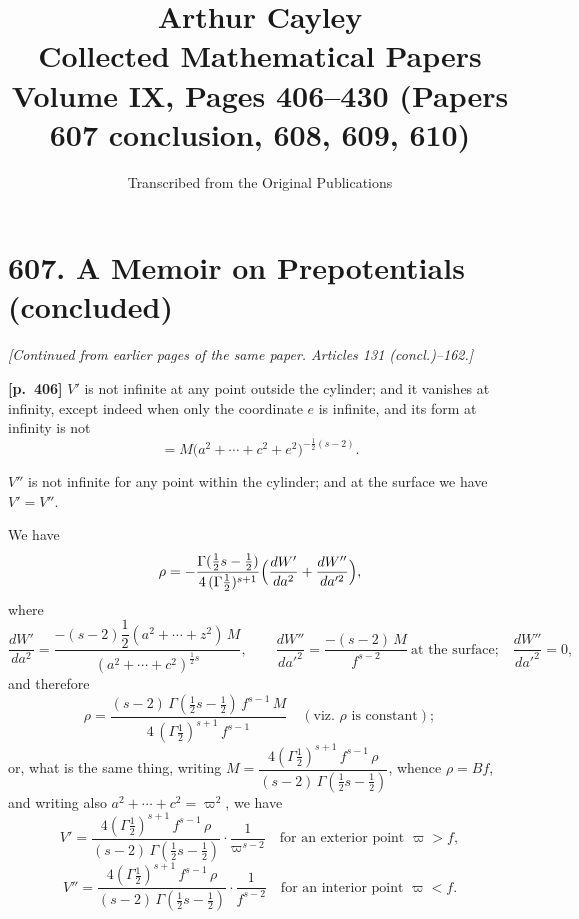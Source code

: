 \documentclass[11pt,a4paper]{article}
\title{\textbf{Arthur Cayley}\\\vspace{0.5em}
\Large Collected Mathematical Papers\\\vspace{0.3em}
\large Volume IX, Pages 406--430 (Papers 607 conclusion, 608, 609, 610)}
\author{Transcribed from the Original Publications}
\date{}
\begin{document}
\maketitle
\thispagestyle{empty}

\tableofcontents
\newpage

\section*{\textbf{607.} A Memoir on Prepotentials (concluded)}

\textit{[Continued from earlier pages of the same paper. Articles 131 (concl.)--162.]}

\bigskip

\noindent\textbf{[p.~406]}\quad
$V'$ is not infinite at any point outside the cylinder; and it vanishes at infinity, except indeed when only the coordinate $e$ is infinite, and its form at infinity is not
\[
= M\bigl(a^{2}+\cdots+c^{2}+e^{2}\bigr)^{-\tfrac{1}{2}(s-2)}.
\]

$V''$ is not infinite for any point within the cylinder; and at the surface we have $V' = V''$.

We have
\[
\rho = -\frac{\Gamma(\tfrac{1}{2}s-\tfrac{1}{2})}{4\,(\Gamma\tfrac{1}{2})^{s+1}}\Bigl(\frac{dW'}{da^{2}} + \frac{dW''}{da'^{2}}\Bigr),
\]
where
\[
\frac{dW'}{da^{2}} = \frac{-(s-2)\dfrac{1}{2}(a^{2}+\cdots+z^{2})\,M}{(a^{2}+\cdots+c^{2})^{\tfrac{1}{2}s}},\qquad \frac{dW''}{da'^{2}} = \frac{-(s-2)\,M}{f^{s-2}}\ \text{at the surface;}\quad \frac{dW''}{da'^{2}} = 0,
\]
and therefore
\[
\rho = \frac{(s-2)\,\Gamma(\tfrac{1}{2}s-\tfrac{1}{2})\,f^{s-1}\,M}{4\,(\Gamma\tfrac{1}{2})^{s+1}\,f^{s-1}}\quad(\text{viz.\ }\rho\text{ is constant});
\]
or, what is the same thing, writing $M = \dfrac{4(\Gamma\tfrac{1}{2})^{s+1}\,f^{s-1}\,\rho}{(s-2)\,\Gamma(\tfrac{1}{2}s-\tfrac{1}{2})}$, whence $\rho = Bf$, and writing also $a^{2}+\cdots+c^{2}=\varpi^{2}$, we have
\[
V' = \frac{4(\Gamma\tfrac{1}{2})^{s+1}\,f^{s-1}\,\rho}{(s-2)\,\Gamma(\tfrac{1}{2}s-\tfrac{1}{2})}\cdot\frac{1}{\varpi^{s-2}}\quad\text{for an exterior point }\varpi > f,
\]
\[
V'' = \frac{4(\Gamma\tfrac{1}{2})^{s+1}\,f^{s-1}\,\rho}{(s-2)\,\Gamma(\tfrac{1}{2}s-\tfrac{1}{2})}\cdot\frac{1}{f^{s-2}}\quad\text{for an interior point }\varpi < f.
\]
\end{document}
